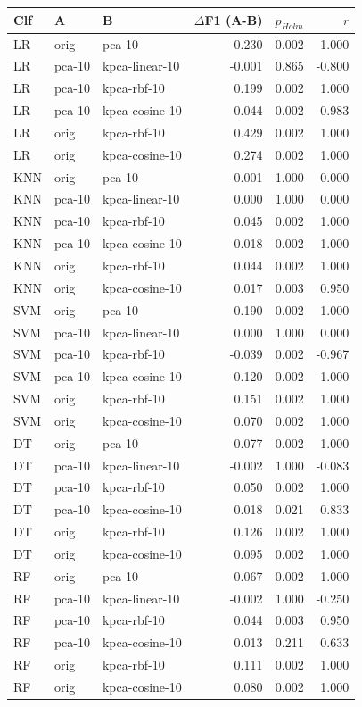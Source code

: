 \begin{tabular}{lllrrr}
\toprule
Clf & A & B & $\Delta$F1 (A-B) & $p_{Holm}$ & $r$ \\
\midrule
LR & orig & pca-10 & 0.230 & 0.002 & 1.000 \\
LR & pca-10 & kpca-linear-10 & -0.001 & 0.865 & -0.800 \\
LR & pca-10 & kpca-rbf-10 & 0.199 & 0.002 & 1.000 \\
LR & pca-10 & kpca-cosine-10 & 0.044 & 0.002 & 0.983 \\
LR & orig & kpca-rbf-10 & 0.429 & 0.002 & 1.000 \\
LR & orig & kpca-cosine-10 & 0.274 & 0.002 & 1.000 \\
KNN & orig & pca-10 & -0.001 & 1.000 & 0.000 \\
KNN & pca-10 & kpca-linear-10 & 0.000 & 1.000 & 0.000 \\
KNN & pca-10 & kpca-rbf-10 & 0.045 & 0.002 & 1.000 \\
KNN & pca-10 & kpca-cosine-10 & 0.018 & 0.002 & 1.000 \\
KNN & orig & kpca-rbf-10 & 0.044 & 0.002 & 1.000 \\
KNN & orig & kpca-cosine-10 & 0.017 & 0.003 & 0.950 \\
SVM & orig & pca-10 & 0.190 & 0.002 & 1.000 \\
SVM & pca-10 & kpca-linear-10 & 0.000 & 1.000 & 0.000 \\
SVM & pca-10 & kpca-rbf-10 & -0.039 & 0.002 & -0.967 \\
SVM & pca-10 & kpca-cosine-10 & -0.120 & 0.002 & -1.000 \\
SVM & orig & kpca-rbf-10 & 0.151 & 0.002 & 1.000 \\
SVM & orig & kpca-cosine-10 & 0.070 & 0.002 & 1.000 \\
DT & orig & pca-10 & 0.077 & 0.002 & 1.000 \\
DT & pca-10 & kpca-linear-10 & -0.002 & 1.000 & -0.083 \\
DT & pca-10 & kpca-rbf-10 & 0.050 & 0.002 & 1.000 \\
DT & pca-10 & kpca-cosine-10 & 0.018 & 0.021 & 0.833 \\
DT & orig & kpca-rbf-10 & 0.126 & 0.002 & 1.000 \\
DT & orig & kpca-cosine-10 & 0.095 & 0.002 & 1.000 \\
RF & orig & pca-10 & 0.067 & 0.002 & 1.000 \\
RF & pca-10 & kpca-linear-10 & -0.002 & 1.000 & -0.250 \\
RF & pca-10 & kpca-rbf-10 & 0.044 & 0.003 & 0.950 \\
RF & pca-10 & kpca-cosine-10 & 0.013 & 0.211 & 0.633 \\
RF & orig & kpca-rbf-10 & 0.111 & 0.002 & 1.000 \\
RF & orig & kpca-cosine-10 & 0.080 & 0.002 & 1.000 \\
\bottomrule
\end{tabular}
